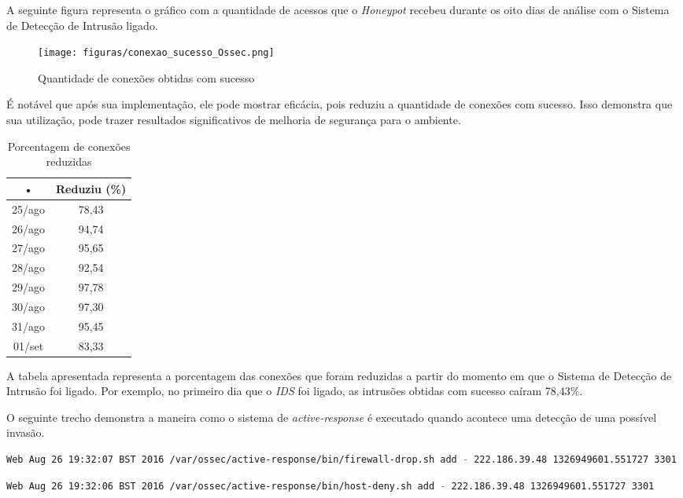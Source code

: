 A seguinte figura representa o gráfico com a quantidade de acessos que o \textit{Honeypot} recebeu durante os oito dias de análise com o Sistema de Detecção de Intrusão ligado.

\begin{figure}[!h]
\centering
\texttt{[image: figuras/conexao\_sucesso\_Ossec.png]}
\caption{Quantidade de conexões obtidas com sucesso} 	
\end{figure}

\newpage
É notável que após sua implementação, ele pode mostrar eficácia, pois reduziu a quantidade de conexões com sucesso. Isso demonstra que sua utilização, pode trazer resultados significativos de melhoria de segurança para o ambiente.

\begin{table}[htb]
\centering
\caption{Porcentagem de conexões reduzidas}
\begin{tabular}{|c|c|}
\hline 
• & Reduziu (\%) \\ 
\hline 
25/ago & 78,43 \\ 
\hline 
26/ago & 94,74 \\ 
\hline 
27/ago & 95,65 \\ 
\hline 
28/ago & 92,54 \\ 
\hline 
29/ago & 97,78 \\ 
\hline 
30/ago & 97,30 \\ 
\hline 
31/ago & 95,45 \\ 
\hline 
01/set & 83,33 \\ \hline
\end{tabular} 
\end{table}

A tabela apresentada representa a porcentagem das conexões que foram reduzidas a partir do momento em que o Sistema de Detecção de Intrusão foi ligado. Por exemplo, no primeiro dia que o \textit{IDS} foi ligado, as intrusões obtidas com sucesso caíram 78,43\%.

O seguinte trecho demonstra a maneira como o sistema de \textit{active-response} é executado quando acontece uma detecção de uma possível invasão.

\begin{lstlisting}[language=bash]
Web Aug 26 19:32:07 BST 2016 /var/ossec/active-response/bin/firewall-drop.sh add - 222.186.39.48 1326949601.551727 3301
\end{lstlisting}

\begin{lstlisting}[language=bash]
Web Aug 26 19:32:06 BST 2016 /var/ossec/active-response/bin/host-deny.sh add - 222.186.39.48 1326949601.551727 3301
\end{lstlisting}

